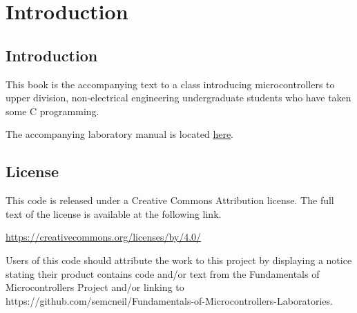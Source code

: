 \chapter{Introduction}

\section{Introduction}
This book is the accompanying text to a class introducing microcontrollers
to upper division, non-electrical engineering undergraduate students who 
have taken some C programming.

The accompanying laboratory manual is located 
\href{https://github.com/semcneil/Fundamentals-of-Microcontrollers-Manual}{here}.

\section{License}
This code is released under a Creative Commons Attribution license.
The full text of the license is available at the following link.

\href{https://creativecommons.org/licenses/by/4.0/}{https://creativecommons.org/licenses/by/4.0/}

Users of this code should attribute the work to this
project by displaying a notice stating their product contains code
and/or text from the Fundamentals of Microcontrollers Project and/or linking to\\
https://github.com/semcneil/Fundamentals-of-Microcontrollers-Laboratories.
